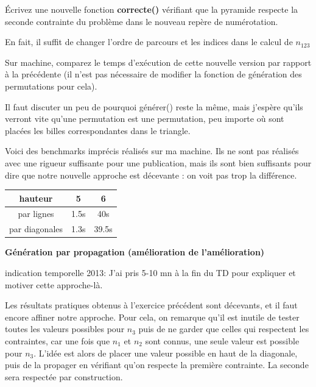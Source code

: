 \documentclass[10pt]{article}\usepackage[nu]{esial}
\begin{document}
\Question %
Écrivez une nouvelle fonction \textbf{correcte()} vérifiant que la pyramide
respecte la seconde contrainte du problème dans le nouveau repère de numérotation.

\begin{Reponse}
  En fait, il suffit de changer l'ordre de parcours et les indices dans le calcul de $n_{123}$
  
  \newcommand*\FancyVerbStartString{// BEGIN CORRECTE}
  \newcommand*\FancyVerbStopString{// END CORRECTE}
\end{Reponse}

\begin{Question}
  Sur machine, comparez le temps d'exécution de cette nouvelle version par
  rapport à la précédente (il n'est pas nécessaire de modifier la fonction de
  génération des permutations pour cela).
\end{Question}

\begin{Reponse}
  Il faut discuter un peu de pourquoi générer() reste la même, mais j'espère
  qu'ils verront vite qu'une permutation est une permutation, peu importe où
  sont placées les billes correspondantes dans le triangle.
  
  Voici des benchmarks imprécis réalisés sur ma machine. Ils ne sont pas
  réalisés avec une rigueur suffisante pour une publication, mais ils sont bien
  suffisants pour dire que notre nouvelle approche est décevante : on voit pas
  trop la différence.

  \begin{tabular}{|c|c|c|}\hline
    hauteur       &5&6\\\hline
    par lignes    &1.5s&40s\\\hline
    par diagonales&1.3s&39.5s\\\hline
  \end{tabular}
\end{Reponse}

\begin{Exercice}\textbf{Génération par propagation (amélioration de l'amélioration)}
\end{Exercice}

\begin{Reponse}
  indication temporelle 2013: J'ai pris 5-10 mn à la fin du TD pour expliquer et
  motiver cette approche-là.
\end{Reponse}

\noindent Les résultats pratiques obtenus à l'exercice précédent sont décevants,
et il faut encore affiner notre approche. Pour cela, on remarque qu'il est
inutile de tester toutes les valeurs possibles pour $n_3$ puis de ne garder que
celles qui respectent les contraintes, car une fois que $n_1$ et $n_2$ sont
connus, une seule valeur est possible pour $n_3$. L'idée est alors de placer
une valeur possible en haut de la diagonale, puis de la propager en vérifiant
qu'on respecte la première contrainte. La seconde sera respectée par construction.
\end{document}
